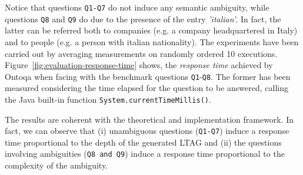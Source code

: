 Notice that questions \texttt{Q1-Q7} do not induce any semantic ambiguity, while questions \texttt{Q8} and \texttt{Q9} do due to the presence of the entry \textit{'italian'}. In fact, the latter can be referred both to companies (e.g. a company headquartered in Italy) and to people (e.g. a person with italian nationality).
%
The experiments have been carried out by averaging measurements on randomly ordered 10 executions.
%
Figure~\ref{fig:evaluation-response-time} shows, the \textit{response time} achieved by Ontoqa when facing with the benchmark questions \texttt{Q1}-\texttt{Q8}.
%
The former has been measured considering the time elapsed for the question to be answered, calling the Java built-in function \texttt{System.currentTimeMillis()}.

The results are coherent with the theoretical and implementation framework. In fact, we can observe that (i) unambiguous questions (\texttt{Q1-Q7}) induce a response time proportional to the depth of the generated LTAG and (ii) the questions involving ambiguities (\texttt{Q8 and Q9}) induce a response time proportional to the complexity of the ambiguity.